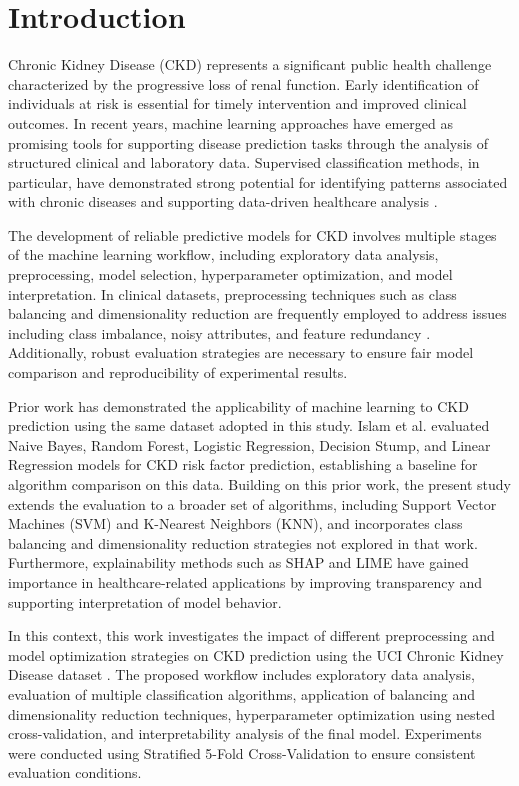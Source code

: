 \section{Introduction}

Chronic Kidney Disease (CKD) represents a significant public health challenge
characterized by the progressive loss of renal function. Early identification of
individuals at risk is essential for timely intervention and improved clinical
outcomes. In recent years, machine learning approaches have emerged as promising
tools for supporting disease prediction tasks through the analysis of structured
clinical and laboratory data. Supervised classification methods, in particular,
have demonstrated strong potential for identifying patterns associated with
chronic diseases and supporting data-driven healthcare analysis
\cite{obermeyer2016,deo2015}.

The development of reliable predictive models for CKD involves multiple stages
of the machine learning workflow, including exploratory data analysis,
preprocessing, model selection, hyperparameter optimization, and model
interpretation. In clinical datasets, preprocessing techniques such as class
balancing and dimensionality reduction are frequently employed to address issues
including class imbalance, noisy attributes, and feature redundancy
\cite{he2009imbalanced,chawla2002smote}.
Additionally, robust evaluation strategies are necessary to ensure fair model
comparison and reproducibility of experimental results.

Prior work has demonstrated the applicability of machine learning to CKD
prediction using the same dataset adopted in this study. Islam et al.
\cite{inproceedings} evaluated Naive Bayes, Random Forest, Logistic Regression,
Decision Stump, and Linear Regression models for CKD risk factor prediction,
establishing a baseline for algorithm comparison on this data. Building on this
prior work, the present study extends the evaluation to a broader set of
algorithms, including Support Vector Machines (SVM) and K-Nearest Neighbors
(KNN), and incorporates class balancing and dimensionality reduction strategies
not explored in that work. Furthermore, explainability methods such as SHAP and
LIME have gained importance in healthcare-related applications by improving
transparency and supporting interpretation of model behavior.

In this context, this work investigates the impact of different preprocessing
and model optimization strategies on CKD prediction using the UCI Chronic Kidney
Disease dataset \cite{risk_factor_prediction_of_chronic_kidney_disease_857}. The
proposed workflow includes exploratory data analysis, evaluation of multiple
classification algorithms, application of balancing and dimensionality reduction
techniques, hyperparameter optimization using nested cross-validation, and
interpretability analysis of the final model. Experiments were conducted using
Stratified 5-Fold Cross-Validation to ensure consistent evaluation conditions.

